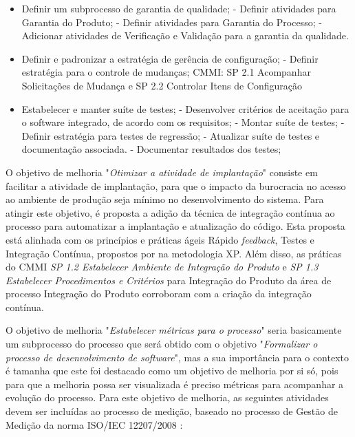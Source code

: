\begin{itemize}
  \item Definir um subprocesso de garantia de qualidade;
    \subitem - Definir atividades para Garantia do Produto;
    \subitem - Definir atividades para Garantia do Processo;
    \subitem - Adicionar atividades de Verificação e Validação para a garantia da qualidade.
  \item Definir e padronizar a estratégia de gerência de configuração;
    \subitem - Definir estratégia para o controle de mudanças;
      \subsubitem CMMI: SP 2.1 Acompanhar Solicitações de Mudança e SP 2.2 Controlar Itens de Configuração 
  \item Estabelecer e manter suíte de testes;
    \subitem - Desenvolver critérios de aceitação para o software integrado, de acordo com os requisitos;
    \subitem - Montar suíte de testes;
    \subitem - Definir estratégia para testes de regressão;
    \subitem - Atualizar suíte de testes e documentação associada.
    \subitem - Documentar resultados dos testes;
\end{itemize}

O objetivo de melhoria "\emph{Otimizar a atividade de implantação}" consiste em facilitar a atividade de implantação,
para que o impacto da burocracia no acesso ao ambiente de produção seja mínimo no desenvolvimento do sistema.
Para atingir este objetivo, é proposta a adição da técnica de integração contínua ao processo para automatizar a
implantação e atualização do código. Esta proposta está alinhada com os princípios e práticas ágeis Rápido \textit{feedback},
Testes e Integração Contínua, propostos por  na metodologia XP. Além disso, as práticas do CMMI 
\textit{SP 1.2 Estabelecer Ambiente de Integração do Produto} e 
\textit{SP 1.3 Estabelecer Procedimentos e Critérios} para Integração do Produto da área de processo Integração 
do Produto corroboram com a criação da integração contínua.

O objetivo de melhoria "\emph{Estabelecer métricas para o processo}" seria basicamente um subprocesso 
do processo que será obtido com o objetivo "\emph{Formalizar o processo de desenvolvimento de software}", 
mas a sua importância para o contexto é tamanha que este foi destacado como um objetivo de melhoria por si só,
pois para que a melhoria possa ser visualizada é preciso métricas para acompanhar a evolução do processo.
Para este objetivo de melhoria, as seguintes atividades devem ser incluídas ao processo de medição,
baseado no processo de Gestão de Medição da norma ISO/IEC 12207/2008 \cite{12207}:

